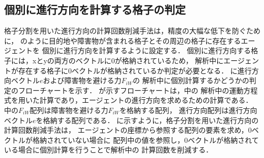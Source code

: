 \subsection{個別に進行方向を計算する格子の判定}
格子分割を用いた進行方向の計算回数削減手法は，精度の大幅な低下を防ぐために，
のように目的地や障害物が含まれる格子とその周辺の格子に存在するエージェントを
個別に進行方向を計算するように設定する．
個別に進行方向する格子には，xとyの両方のベクトルに0が格納されているため，
解析中にエージェントが存在する格子に0ベクトルが格納されているか判定が必要となる．
に進行方向ベクトル$e$および障害物を避ける力$F_{iW}$の
解析中に個別計算するかどうかの判定のフローチャートを示す．
が示すフローチャートは，中の
解析中の運動方程式を用いた計算であり，エージェントの進行方向を求めるための計算である．
中の$F_{iW}$配列は障害物を避ける力$F_{iW}$を格納する配列，
進行方向配列は進行方向ベクトル$e$を格納する配列である．
に示すように，格子分割を用いた進行方向の計算回数削減手法は，
エージェントの座標から参照する配列の要素を求め，0ベクトルが格納されていない場合に
配列中の値を参照し，0ベクトルが格納されている場合に個別計算を行うことで解析中の
計算回数を削減する．


\clearpage


